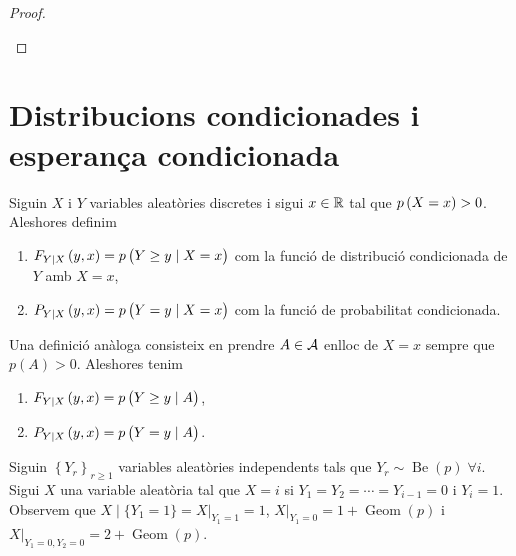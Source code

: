 \begin{proof} %
    \begin{enumerate}[i)]
    \end{enumerate}
\end{proof}

\section{Distribucions condicionades i esperança condicionada}

\begin{defi}
  Siguin $X$ i $Y$ variables aleatòries discretes i sigui $x\in\mathbb{R}$ tal que $p\left( X=x\right) >0$. Aleshores definim
  \begin{enumerate}[1)]
   \item $F_{Y\vert X} \left( y,x\right)=p\left( Y\geq y\mid X=x \right)$ com la funció de distribució condicionada de $Y$ amb $X=x$,
   \item $P_{Y\vert X} \left( y,x\right)=p\left( Y = y\mid X=x \right)$ com la funció de probabilitat condicionada.
  \end{enumerate} 
\end{defi}

\begin{obs}
 Una definició anàloga consisteix en prendre $A\in\mathcal{A}$ enlloc de $X=x$ sempre que $p(A)>0$. Aleshores tenim
 \begin{enumerate}[1)]
   \item $F_{Y\vert X} \left( y,x\right)=p\left( Y\geq y\mid A \right)$,
   \item $P_{Y\vert X} \left( y,x\right)=p\left( Y = y\mid A \right)$.
  \end{enumerate} 
\end{obs}

\begin{example}
 Siguin $\left\{Y_r\right\}_{r\geq 1}$ variables aleatòries independents tals que $Y_r \sim \operatorname{Be}(p)\; \forall i$. Sigui $X$ una 
 variable aleatòria tal que $X=i$ si $Y_1 = Y_2 = \cdots = Y_{i-1}=0$ i $Y_i=1$. Observem que $X\mid\{Y_1=1\}= X\vert_{Y_1=1}=1$, 
 $X\vert_{Y_1=0}=1+\operatorname{Geom}(p)$ i $X\vert_{Y_1=0,Y_2=0}=2+\operatorname{Geom}(p)$.
\end{example}
